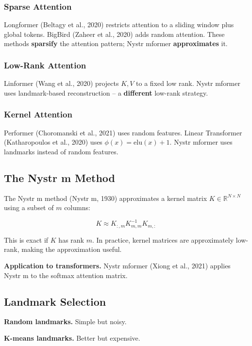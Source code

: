 \subsubsection{Sparse Attention}

Longformer (Beltagy et al., 2020) restricts attention to a sliding window 
plus global tokens. BigBird (Zaheer et al., 2020) adds random attention. 
These methods \textbf{sparsify} the attention pattern; Nystr mformer 
\textbf{approximates} it.

\subsubsection{Low-Rank Attention}

Linformer (Wang et al., 2020) projects $K, V$ to a fixed low rank. Nystr mformer 
uses landmark-based reconstruction -- a \textbf{different} low-rank strategy.

\subsubsection{Kernel Attention}

Performer (Choromanski et al., 2021) uses random features. Linear Transformer 
(Katharopoulos et al., 2020) uses $\phi(x) = \mathrm{elu}(x) + 1$. Nystr mformer 
uses landmarks instead of random features.

\subsection{The Nystr m Method}

The Nystr m method (Nystr m, 1930) approximates a kernel matrix $K \in \mathbb{R}^{N \times N}$ 
using a subset of $m$ columns:

\[
K \approx K_{:, m} K_{m, m}^{-1} K_{m, :}
\tag{2.1}
\]

This is exact if $K$ has rank $m$. In practice, kernel matrices are 
approximately low-rank, making the approximation useful.

\textbf{Application to transformers.} Nystr mformer (Xiong et al., 2021) applies 
Nystr m to the softmax attention matrix.

\subsection{Landmark Selection}

\textbf{Random landmarks.} Simple but noisy.

\textbf{K-means landmarks.} Better but expensive.

